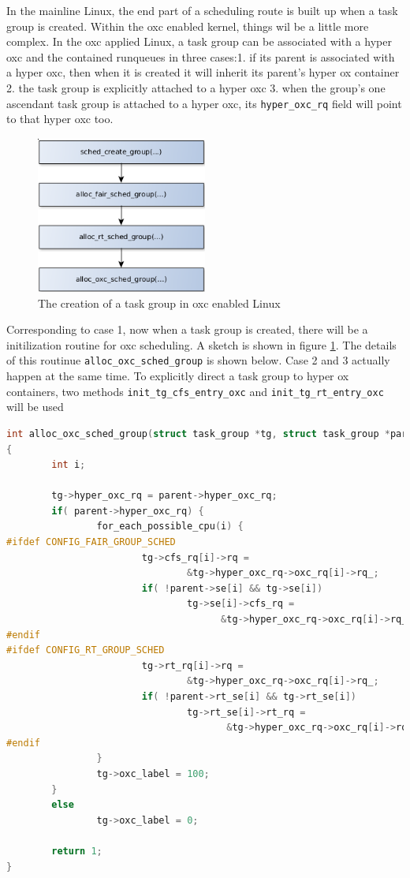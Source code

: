 In the mainline Linux, the end part of a scheduling route is built up when
a task group is created. Within the oxc enabled kernel, things wil be a 
little more complex. In the oxc applied Linux, a task group can be associated 
with a hyper oxc and the contained runqueues in three cases:1. if its parent 
is associated with a hyper oxc, then when it is created it will inherit its 
parent's hyper ox container 2. the task group is explicitly attached to
a hyper oxc 3. when the group's one ascendant task group is attached to 
a hyper oxc, its \texttt{hyper\_oxc\_rq} field will point to that hyper 
oxc too. 

\begin{figure}[htbp]
        \centering
        \includegraphics[height=0.25\textheight,width=0.5\textwidth]{images/tg_creation_oxc}
        \caption{The creation of a task group in oxc enabled Linux}
        \label{fig:tg_creation_oxc}
\end{figure}
Corresponding to case 1, now when a task group is created, there 
will be a initilization routine for oxc scheduling. A sketch is shown in 
figure \ref{fig:tg_creation_oxc}. The details of this routinue 
\texttt{alloc\_oxc\_sched\_group} is shown below. Case 2 and 3 actually 
happen at the same time. To explicitly direct a task group to hyper ox 
containers, two methods \texttt{init\_tg\_cfs\_entry\_oxc} and
\texttt{init\_tg\_rt\_entry\_oxc} will be used
\begin{lstlisting}[language=C,
        caption={OXC scheduling related initilization 
					during task group creation}]
int alloc_oxc_sched_group(struct task_group *tg, struct task_group *parent)
{
        int i;

        tg->hyper_oxc_rq = parent->hyper_oxc_rq;
        if( parent->hyper_oxc_rq) {
                for_each_possible_cpu(i) {
#ifdef CONFIG_FAIR_GROUP_SCHED
                        tg->cfs_rq[i]->rq =
                                &tg->hyper_oxc_rq->oxc_rq[i]->rq_;
                        if( !parent->se[i] && tg->se[i])
                                tg->se[i]->cfs_rq =
                                      &tg->hyper_oxc_rq->oxc_rq[i]->rq_.cfs;
#endif
#ifdef CONFIG_RT_GROUP_SCHED
                        tg->rt_rq[i]->rq =
                                &tg->hyper_oxc_rq->oxc_rq[i]->rq_;
                        if( !parent->rt_se[i] && tg->rt_se[i])
                                tg->rt_se[i]->rt_rq =
                                       &tg->hyper_oxc_rq->oxc_rq[i]->rq_.rt;
#endif
                }
                tg->oxc_label = 100;
        }
        else
                tg->oxc_label = 0;

        return 1;
}
\end{lstlisting}
